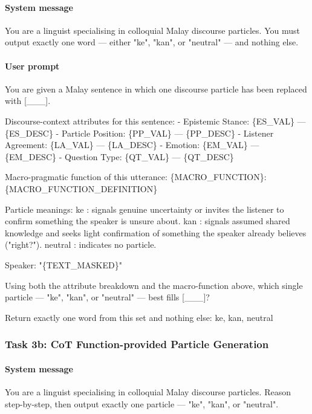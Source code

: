 \documentclass[11pt]{article}
\begin{document}
\paragraph{System message}
\begin{PromptBlock}
You are a linguist specialising in colloquial Malay discourse particles. You must output exactly one word --- either "ke", "kan", or "neutral" --- and nothing else.
\end{PromptBlock}

\paragraph{User prompt}
\begin{PromptBlock}
You are given a Malay sentence in which one discourse particle has been replaced with [\_\_\_].

Discourse-context attributes for this sentence:
- Epistemic Stance: \{ES\_VAL\} --- \{ES\_DESC\}
- Particle Position: \{PP\_VAL\} --- \{PP\_DESC\}
- Listener Agreement: \{LA\_VAL\} --- \{LA\_DESC\}
- Emotion: \{EM\_VAL\} --- \{EM\_DESC\}
- Question Type: \{QT\_VAL\} --- \{QT\_DESC\}

Macro-pragmatic function of this utterance:
\{MACRO\_FUNCTION\}: \{MACRO\_FUNCTION\_DEFINITION\}

Particle meanings:
  ke      : signals genuine uncertainty or invites the listener to confirm something the speaker is unsure about.
  kan     : signals assumed shared knowledge and seeks light confirmation of something the speaker already believes ("right?").
  neutral : indicates no particle.

Speaker:
  "\{TEXT\_MASKED\}"

Using both the attribute breakdown and the macro-function above, which single particle --- "ke", "kan", or "neutral" --- best fills [\_\_\_]?

Return exactly one word from this set and nothing else: ke, kan, neutral
\end{PromptBlock}


\subsubsection{Task 3b: CoT Function-provided Particle Generation}
\paragraph{System message}
\begin{PromptBlock}
You are a linguist specialising in colloquial Malay discourse particles. Reason step-by-step, then output exactly one particle --- "ke", "kan", or "neutral".
\end{PromptBlock}
\end{document}
